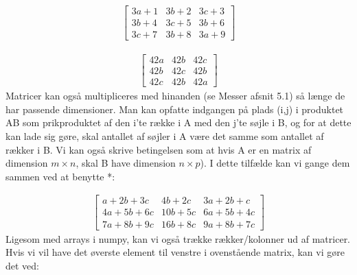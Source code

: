 \documentclass[letterpaper,10pt,english]{jupyterBook}
\begin{document}
\begin{sphinxVerbatim}[commandchars=\\\{\}]
    
\end{sphinxVerbatim}
\begin{equation*}
\begin{split}\displaystyle \left[\begin{matrix}3 a + 1 & 3 b + 2 & 3 c + 3\\3 b + 4 & 3 c + 5 & 3 b + 6\\3 c + 7 & 3 b + 8 & 3 a + 9\end{matrix}\right]\end{split}
\end{equation*}
\begin{sphinxVerbatim}[commandchars=\\\{\}]
\end{sphinxVerbatim}
\begin{equation*}
\begin{split}\displaystyle \left[\begin{matrix}42 a & 42 b & 42 c\\42 b & 42 c & 42 b\\42 c & 42 b & 42 a\end{matrix}\right]\end{split}
\end{equation*}
Matricer kan også multipliceres med hinanden (se Messer afsnit 5.1) så længe de har passende dimensioner. Man kan opfatte indgangen på plads (i,j) i produktet AB som prikproduktet af den i’te række i A med den j’te søjle i B, og for at dette kan lade sig gøre, skal antallet af søjler i A være det samme som antallet af rækker i B. Vi kan også skrive betingelsen som at hvis A er en matrix af dimension \(m \times n\), skal B have dimension \(n \times p\)). I dette tilfælde kan vi gange dem sammen ved at benytte *:

\begin{sphinxVerbatim}[commandchars=\\\{\}]
  
\end{sphinxVerbatim}
\begin{equation*}
\begin{split}\displaystyle \left[\begin{matrix}a + 2 b + 3 c & 4 b + 2 c & 3 a + 2 b + c\\4 a + 5 b + 6 c & 10 b + 5 c & 6 a + 5 b + 4 c\\7 a + 8 b + 9 c & 16 b + 8 c & 9 a + 8 b + 7 c\end{matrix}\right]\end{split}
\end{equation*}
Ligesom med arrays i numpy, kan vi også trække rækker/kolonner ud af matricer. Hvis vi vil have det øverste element til venstre i ovenstående matrix, kan vi gøre det ved:
\end{document}
